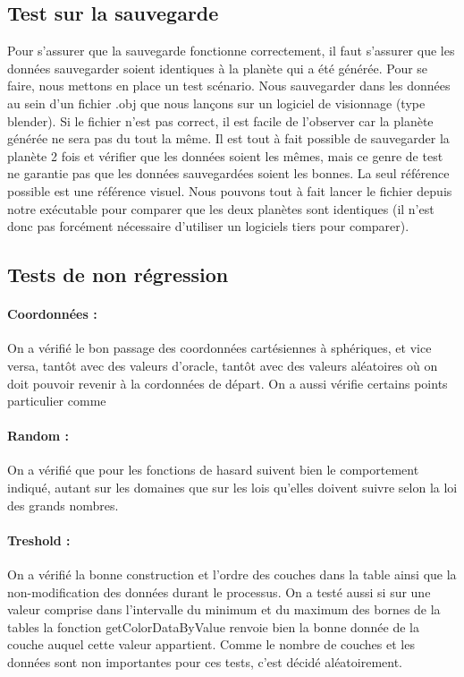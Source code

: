 \documentclass[a4paper]{article}
\begin{document}
\subsection{Test sur la sauvegarde}

Pour s'assurer que la sauvegarde fonctionne correctement, il faut s'assurer que les données sauvegarder soient identiques à la planète qui a été générée. Pour se faire, nous mettons en place un test scénario. Nous sauvegarder dans les données au sein d'un fichier .obj que nous lançons sur un logiciel de visionnage (type blender). Si le fichier n'est pas correct, il est facile de l'observer car la planète générée ne sera pas du tout la même. Il est tout à fait possible de sauvegarder la planète 2 fois et vérifier que les données soient les mêmes, mais ce genre de test ne garantie pas que les données sauvegardées soient les bonnes. La seul référence possible est une référence visuel. Nous pouvons tout à fait lancer le fichier depuis notre exécutable pour comparer que les deux planètes sont identiques (il n'est donc pas forcément nécessaire d'utiliser un logiciels tiers pour comparer).

\subsection{Tests de non régression}

\paragraph{Coordonnées : } On a vérifié le bon passage des coordonnées cartésiennes à sphériques, et vice versa, tantôt avec des valeurs d'oracle, tantôt avec des valeurs aléatoires où on doit pouvoir revenir à la cordonnées de départ.
On a aussi vérifie certains points particulier comme 

\paragraph{Random : } On a vérifié que pour les fonctions de hasard suivent bien le comportement indiqué, autant sur les domaines que sur les lois qu'elles doivent suivre selon la loi des grands nombres.

\paragraph{Treshold : } On a vérifié la bonne construction et l'ordre des couches dans la table ainsi que la non-modification des données durant le processus. 
On a testé aussi si sur une valeur comprise dans l'intervalle du minimum et du maximum des bornes de la tables la fonction getColorDataByValue renvoie bien la bonne donnée de la couche auquel cette valeur appartient.
Comme le nombre de couches et les données sont non importantes pour ces tests, c'est décidé aléatoirement.
\end{document}
